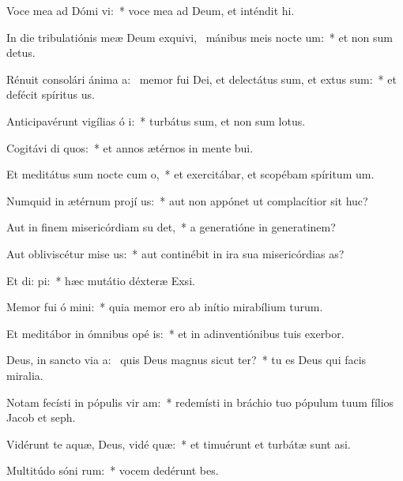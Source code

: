 \item Voce mea ad Dómi vi:~* voce mea ad Deum, et inténdit hi.
\item In die tribulatiónis meæ Deum exquivi,~\pscross{} mánibus meis nocte  um:~* et non sum detus.
\item Rénuit consolári ánima a:~\pscross{} memor fui Dei, et delectátus sum, et extus sum:~* et defécit spíritus us.
\item Anticipavérunt vigílias ó i:~* turbátus sum, et non sum lotus.
\item Cogitávi di quos:~* et annos ætérnos in mente bui.
\item Et meditátus sum nocte cum  o,~* et exercitábar, et scopébam spíritum um.
\item Numquid in ætérnum projí us:~* aut non appónet ut complacítior sit huc?
\item Aut in finem misericórdiam su det,~* a generatióne in generatinem?
\item Aut obliviscétur mise us:~* aut continébit in ira sua misericórdias as?
\item Et di:  pi:~* hæc mutátio déxteræ Exsi.
\item Memor fui ó mini:~* quia memor ero ab inítio mirabílium turum.
\item Et meditábor in ómnibus opé is:~* et in adinventiónibus tuis exerbor.
\item Deus, in sancto via a:~\pscross{} quis Deus magnus sicut  ter?~* tu es Deus qui facis miralia.
\item Notam fecísti in pópulis vir am:~* redemísti in bráchio tuo pópulum tuum fílios Jacob et seph.
\item Vidérunt te aquæ, Deus, vidé  quæ:~* et timuérunt et turbátæ sunt asi.
\item Multitúdo sóni rum:~* vocem dedérunt bes.
